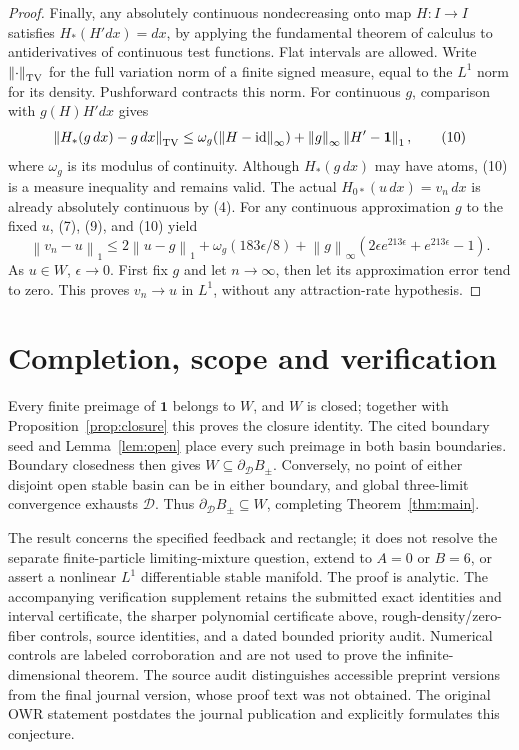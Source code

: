 \documentclass[11pt]{article}
\newcommand{\D}{\mathcal D}
\newcommand{\norm}[1]{\left\lVert#1\right\rVert}
\newcommand{\one}{\mathbf 1}
\DeclareMathOperator{\id}{id}
\begin{document}
\begin{proof}
Finally, any absolutely continuous nondecreasing onto map $H:I\to I$
satisfies $H_*(H'dx)=dx$, by applying the fundamental theorem of calculus to
antiderivatives of continuous test functions. Flat intervals are allowed.
Write $\norm{\cdot}_{\rm TV}$ for the full variation norm of a finite signed
measure, equal to the $L^1$ norm for its density. Pushforward contracts this
norm. For continuous $g$, comparison with $g(H)H'dx$ gives
\[
 \norm{H_*(g\,dx)-g\,dx}_{\rm TV}
 \le\omega_g(\norm{H-\id}_\infty)+\norm{g}_\infty\norm{H'-\one}_1,
                                                               \tag{10}
\]
where $\omega_g$ is its modulus of continuity. Although $H_*(g\,dx)$ may
have atoms, (10) is a measure inequality and remains valid. The actual
$H_{0*}(u\,dx)=v_n\,dx$ is already absolutely continuous by (4).
For any continuous approximation $g$ to the fixed $u$, (7), (9), and (10)
yield
\[
 \norm{v_n-u}_1\le2\norm{u-g}_1+
 \omega_g(183\epsilon/8)+\norm{g}_\infty
                  (2\epsilon e^{213\epsilon}+e^{213\epsilon}-1).
\]
As $u\in W$, $\epsilon\to0$. First fix $g$ and let $n\to\infty$, then let
its approximation error tend to zero. This proves $v_n\to u$ in $L^1$,
without any attraction-rate hypothesis.
\end{proof}

\section{Completion, scope and verification}
Every finite preimage of $\one$ belongs to $W$, and $W$ is closed; together
with Proposition~\ref{prop:closure} this proves the closure identity.
The cited boundary seed and Lemma~\ref{lem:open} place every such preimage in
both basin boundaries. Boundary closedness then gives
$W\subseteq\partial_\D B_\pm$. Conversely, no point of either disjoint open
stable basin can be in either boundary, and global three-limit convergence
exhausts $\D$. Thus $\partial_\D B_\pm\subseteq W$, completing
Theorem~\ref{thm:main}.

The result concerns the specified feedback and rectangle; it does not resolve
the separate finite-particle limiting-mixture question, extend to $A=0$ or
$B=6$, or assert a nonlinear $L^1$ differentiable stable manifold.
The proof is analytic. The accompanying verification supplement retains the
submitted exact identities and interval certificate, the sharper polynomial
certificate above, rough-density/zero-fiber controls, source identities,
and a dated bounded priority audit. Numerical controls are labeled
corroboration and are not used to prove the infinite-dimensional theorem.
The source audit distinguishes accessible preprint versions from the final
journal version, whose proof text was not obtained. The original OWR statement
postdates the journal publication and explicitly formulates this conjecture.
\end{document}
